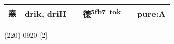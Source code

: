\documentclass[14pt,a4paper]{scrartcl}
\begin{document}
\begin{longtable}[c]{@{}llllll@{}}
\begin{minipage}[t]{0.14\columnwidth}\raggedright\strut
𢛳
\strut\end{minipage} &
\begin{minipage}[t]{0.14\columnwidth}\raggedright\strut
drik, driH
\strut\end{minipage} &
\begin{minipage}[t]{0.14\columnwidth}\raggedright\strut
\strut\end{minipage} &
\begin{minipage}[t]{0.14\columnwidth}\raggedright\strut
德\textsuperscript{5fb7~tok}
\strut\end{minipage} &
\begin{minipage}[t]{0.14\columnwidth}\raggedright\strut
\strut\end{minipage} &
\begin{minipage}[t]{0.14\columnwidth}\raggedright\strut
pure:A
\strut\end{minipage}\tabularnewline
\bottomrule
\end{longtable}

(220) 0920 {[}2{]}
\end{document}
